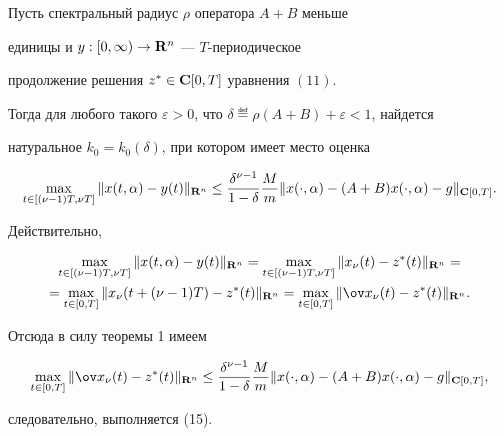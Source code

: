 \begin{thm}


Пусть спектральный радиус ${\rho}$ оператора $A+B$ меньше


единицы и $y:[0,{\infty})\to {\bold R}^n$ --- $T$-периодическое


продолжение решения $z^*\in \bold C[0,T]$ уравнения $(11)$.


Тогда для любого такого ${\varepsilon}>0$, что ${\delta}


\eqdef {\rho}(A+B)+{\varepsilon}<1$, найдется


натуральное $k_0=k_0({\delta})$, при котором имеет место оценка


\begin{equation}


\max_{t\in [({\nu}-1)T,{\nu}T]}\| x(t,{\alpha})-y(t)


\|_{{\bold R}^n} \le 


\frac{{\delta}^{{\nu}-1}}{1-{\delta}}


\frac{M}{m}\|x(\cdot,{\alpha})-(A+B)x(\cdot,{\alpha})-g


\|_{\bold C[0,T]}.


\end{equation}


\end{thm}





\begin{pf} Действительно,


\begin{multline*}


\max_{t\in [({\nu}-1)T,{\nu}T]}\| x(t,{\alpha})-y(t)


\|_{{\bold R}^n}=


\max_{t\in [({\nu}-1)T,{\nu}T]}\| x_{\nu}(t)-z^*(t)


\|_{{\bold R}^n}= \\


%


=\max_{t\in [0,T]}\| x_{\nu}(t+({\nu}-1)T)-z^*(t)


\|_{{\bold R}^n}=


\max_{t\in [0,T]}\| {\ov x_{\nu}}(t)-z^*(t)


\|_{{\bold R}^n}.


\end{multline*}


Отсюда в силу теоремы 1 имеем


$$


\max_{t\in [0,T]}\| {\ov x_{\nu}}(t)-z^*(t)


\|_{{\bold R}^n}\le 


\frac{{\delta}^{{\nu}-1}}{1-{\delta}}


\frac{M}{m}\|x(\cdot,{\alpha})-(A+B)x(\cdot,{\alpha})-g


\|_{\bold C[0,T]},


$$


следовательно, выполняется (15).


\end{pf}





